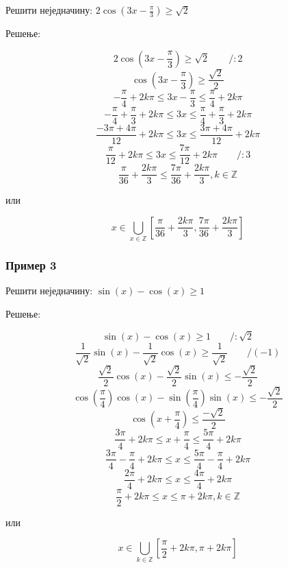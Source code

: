 \documentclass[../diplomski.tex]{subfiles}
\begin{document}
Решити неједначину: $2\cos(3x-\frac{\pi}{3})\ge\sqrt{2}$

Решење:

\[2\cos\left(3x-\frac{\pi}{3}\right)\geq\sqrt{2}\qquad/:2\]
\[\cos\left(3x-\frac{\pi}{3}\right)\geqslant\frac{\sqrt{2}}{2}\]
\[-\frac{\pi}{4}+2k\pi\leq3x-\frac{\pi}{3}\leq\frac{\pi}{4}+2k\pi\]
\[-\frac{\pi}{4}+\frac{\pi}{3}+2k\pi\leq3x\leq\frac{\pi}{4}+\frac{\pi}{3}+2k\pi\]
\[\frac{-3\pi+4\pi}{12}+2k\pi\leq3x\leq\frac{3\pi+4\pi}{12}+2k\pi\]
\[\frac{\pi}{12}+2k\pi\leq3x\leq\frac{7\pi}{12}+2k\pi\qquad/:3\]
\[\frac{\pi}{36}+\frac{2k\pi}{3}\leqslant\frac{7\pi}{36}+\frac{2k\pi}{3},k\in\mathbb{Z}\]
\centerline{или}
\[x\in\bigcup_{x\in\mathbb{Z}}\left[\frac{\pi}{36}+\frac{2k\pi}{3},\frac{7\pi}{36}+\frac{2k\pi}{3}\right]\]

\subsubsection{Пример 3}

Решити неједначину: $\sin(x)-\cos(x)\ge1$

Решење:

\[\sin(x)-\cos(x)\geqslant1\qquad/:\sqrt{2}\]
\[\frac{1}{\sqrt{2}}\sin(x)-\frac{1}{\sqrt{2}}\cos(x)\geqslant\frac{1}{\sqrt{2}}\qquad/(-1)\]
\[\frac{\sqrt{2}}{2}\cos(x)-\frac{\sqrt{2}}{2}\sin(x)\leq-\frac{\sqrt{2}}{2}\]
\[\cos\left(\frac{\pi}{4}\right)\cos(x)-\sin\left(\frac{\pi}{4}\right)\sin(x)\leqslant-\frac{\sqrt{2}}{2}\]
\[\cos\left(x+\frac{\pi}{4}\right)\leq\frac{-\sqrt{2}}{2}\]
\[\frac{3\pi}{4}+2k\pi\leqslant x+\frac{\pi}{4}\leqslant\frac{5\pi}{4}+2k\pi\]
\[\frac{3\pi}{4}-\frac{\pi}{4}+2k\pi\leqslant x\leqslant\frac{5\pi}{4}-\frac{\pi}{4}+2k\pi\]
\[\frac{2\pi}{4}+2k\pi\leqslant x\leqslant\frac{4\pi}{4}+2k\pi\]
\[\frac{\pi}{2}+2k\pi\leqslant x\leqslant\pi+2k\pi,k\in\mathbb{Z}\]
\centerline{или}
\[x\in\bigcup_{k\in\mathbb{Z}}\left[\frac{\pi}{2}+2k\pi,\pi+2k\pi\right]\]
\end{document}
